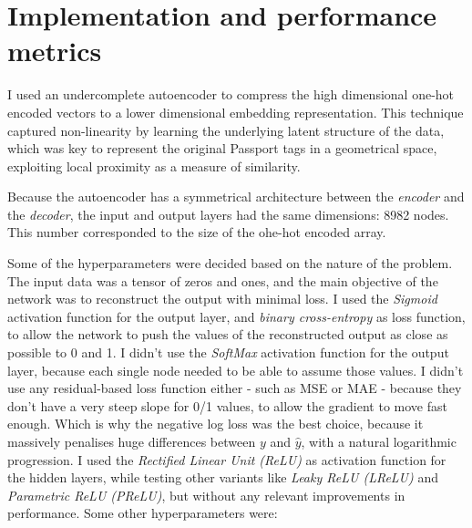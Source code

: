 
\section{Implementation and performance metrics}

I used an undercomplete autoencoder to compress the high dimensional one-hot encoded vectors to a lower dimensional embedding representation.
This technique captured non-linearity by learning the underlying latent structure of the data, which was key to represent the original
Passport tags in a geometrical space, exploiting local proximity as a measure of similarity.

Because the autoencoder has a symmetrical architecture between the \textit{encoder} and the \textit{decoder}, the input and output layers
had the same dimensions: 8982 nodes. This number corresponded to the size of the ohe-hot encoded array.

Some of the hyperparameters were decided based on the nature of the problem. The input data was a tensor of zeros and ones,
and the main objective of the network was to reconstruct the output with minimal loss.
I used the \textit{Sigmoid} activation function for the output layer, and \textit{binary cross-entropy} as loss function,
to allow the network to push the values of the reconstructed output as close as possible to 0 and 1.
I didn't use the \textit{SoftMax} activation function for the output layer, because each single node needed to be able
to assume those values.
I didn't use any residual-based loss function either - such as MSE or MAE - because they don't have a very steep slope
for 0/1 values, to allow the gradient to move fast enough.
Which is why the negative log loss was the best choice, because it massively penalises huge differences between $y$ and  $\hat{y}$,
with a natural logarithmic progression.
I used the \textit{Rectified Linear Unit (ReLU)} as activation function
for the hidden layers, while testing other variants like \textit{Leaky ReLU (LReLU)} and \textit{Parametric ReLU (PReLU)},
but without any relevant improvements in performance. Some other hyperparameters were:

